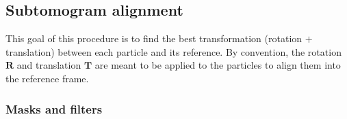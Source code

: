 \subsection{Subtomogram alignment} \label{sec:algo:align}

This goal of this procedure is to find the best transformation (rotation $+$ translation) between each particle and its reference. By convention, the rotation $\bm{R}$ and translation $\bm{T}$ are meant to be applied to the particles to align them into the reference frame.




\subsubsection{Masks and filters}

